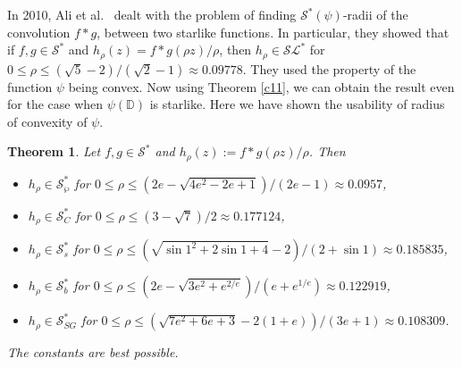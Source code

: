 \documentclass[12pt, reqno]{amsart}
\numberwithin{equation}{section}
\theoremstyle{plain}
\newtheorem{theorem}{Theorem}[section]
\theoremstyle{definition}
\theoremstyle{remark}
\begin{document}
In 2010, Ali et al.~\cite{con2010} dealt with the problem of finding $\mathcal{S}^*(\psi)$-radii of the convolution $f*g$, between two starlike functions. In particular, they showed that if $f,g\in \mathcal{S}^*$ and $h_{\rho}(z)=f*g(\rho z)/\rho$, then $h_{\rho}\in\mathcal{SL}^*$ for $0\leq\rho\leq(\sqrt{5}-2)/(\sqrt{2}-1)\approx0.09778$. They used the property of the function $\psi$ being convex. Now using Theorem \ref{c11}, we can obtain the result even for the case when $\psi(\mathbb{D})$ is starlike. Here we have shown the usability of radius of convexity of $\psi$. 
\begin{theorem}\label{con-star}
	Let $f,g\in \mathcal{S}^*$ and $h_{\rho}(z):=f*g(\rho z)/\rho$. Then 
	\begin{itemize}
		\item [$(i)$]	$h_{\rho}\in \mathcal{S}^*_{\wp}$ for $0\leq\rho\leq (2e-\sqrt{4e^2-2e+1})/(2e-1)\approx0.0957$,
		
		\item [$(ii)$] $h_{\rho}\in \mathcal{S}^*_{C}$ for  $0\leq \rho \leq(3-\sqrt{7})/2\approx0.177124$,
		
		\item [$(iii)$] $h_{\rho}\in \mathcal{S}^*_{s}$ for $0\leq\rho\leq(\sqrt{{\sin1}^2+2\sin1+4}-2)/(2+\sin1)\approx0.185835$,
		
		\item [$(iv)$] $h_{\rho}\in\mathcal{S}^*_{b}$ for $0\leq\rho\leq(2e-\sqrt{3e^2+e^{2/e}})/(e+e^{1/e})\approx0.122919$,
		
		\item [$(v)$] $h_{\rho}\in\mathcal{S}^*_{SG}$ for $0\leq\rho\leq(\sqrt{7e^2+6e+3}-2(1+e))/(3e+1)\approx0.108309$.
		
	\end{itemize}
	The constants are best possible.
\end{theorem} 
\end{document}
